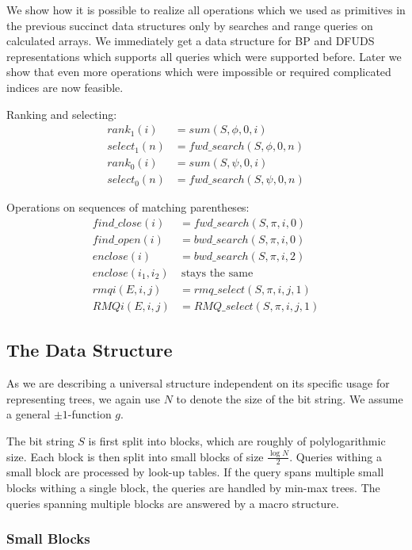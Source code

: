 We show how it is possible to realize all operations which we used as primitives in the previous succinct data structures only by searches and range queries on calculated arrays.
We immediately get a data structure for BP and DFUDS representations which supports all queries which were supported before.
Later we show that even more operations which were impossible or required complicated indices are now feasible.

Ranking and selecting:
\begin{align*}
	rank_1(i) &= sum(S, \phi, 0, i) \\
	select_1(n) &= fwd\_search(S, \phi, 0, n) \\
	rank_0(i) &= sum(S, \psi, 0, i) \\
	select_0(n) &= fwd\_search(S, \psi, 0, n)
\end{align*}

Operations on sequences of matching parentheses:
\begin{align*}
	find\_close(i) &= fwd\_search(S, \pi, i, 0) \\
	find\_open(i) &= bwd\_search(S, \pi, i, 0) \\
	enclose(i) &= bwd\_search(S, \pi, i, 2) \\
	enclose(i_1, i_2)&\ \textrm{stays the same} \\
	rmqi(E, i, j) &= rmq\_select(S, \pi, i, j, 1) \\
	RMQi(E, i, j) &= RMQ\_select(S, \pi, i, j, 1)
\end{align*}

\subsection{The Data Structure}

As we are describing a universal structure independent on its specific usage for representing trees, we again use $N$ to denote the size of the bit string.
We assume a general $\pm 1$-function $g$.

The bit string $S$ is first split into blocks, which are roughly of polylogarithmic size.
Each block is then split into small blocks of size $\frac{\log N}{2}$.
Queries withing a small block are processed by look-up tables.
If the query spans multiple small blocks withing a single block, the queries are handled by min-max trees.
The queries spanning multiple blocks are answered by a macro structure.

\subsubsection{Small Blocks}

